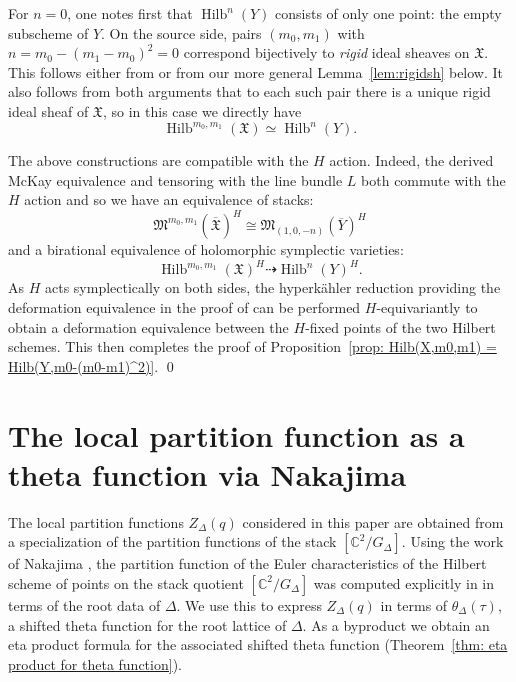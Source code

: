 \documentclass{amsart}
\theoremstyle{definition}
\newcommand{\CC} {{\mathbb C}}          %
\newcommand{\X}{\mathfrak{X}}
\newcommand{\Xbar}{\overline{\mathfrak{X}}}
\newcommand{\Ybar}{\overline{Y}}
\newcommand{\M}{\mathfrak{M}}
\newcommand{\Hilb}{\operatorname{Hilb}}
\newcommand{\adam}{\color{blue}}
\begin{document}
{For $n=0$, one notes first that $\Hilb^{n}(Y)$ consists of only one point: the empty subscheme of $Y$. On the source side, pairs $(m_0,m_1)$ with $n=m_{0} -(m_{1}-m_{0})^{2}=0$ correspond bijectively to \emph{rigid} ideal sheaves on $\X$. This follows either from \cite[Theorem~4.6 and Example~2.25]{fujii2017combinatorial} or from our more general Lemma~\ref{lem:rigidsh} below. It also follows from both arguments that to each such pair there is a unique rigid ideal sheaf of $\X$, so in this case we directly have \[
\Hilb^{m_{0},m_{1}}(\X )\simeq \Hilb^{n}(Y).
\]
}

The above constructions are compatible with the $H$ action. Indeed,
the derived McKay equivalence and tensoring with the line bundle $L$
both commute with the $H$ action and so we have an equivalence of
stacks: 
\[
\M^{m_{0},m_{1}}(\Xbar )^{H} \cong \M_{(1,0,-n)}(\Ybar )^{H}
\]
and a birational equivalence of holomorphic symplectic varieties:
\[
\Hilb^{m_{0},m_{1}}(\X )^{H} \dashrightarrow \Hilb^{n}(Y)^{H}.
\]
{\adam As $H$ acts symplectically on both sides, the hyperkähler reduction providing the deformation equivalence in the proof of
\cite[Cor~4.2]{Nakajima1994Duke} can be performed $H$-equivariantly to obtain a deformation equivalence between the $H$-fixed points of the two Hilbert schemes.
}
This
then completes the proof of Proposition~\ref{prop: Hilb(X,m0,m1) =
Hilb(Y,m0-(m0-m1)^2)}. \qed


\section{The local partition function as a theta function via Nakajima}\label{sec: local partition functions}


The local partition functions $Z_{\Delta}(q)$ considered in this paper
are obtained from a specialization of the partition functions of the
stack $[\CC^{2} /G_{\Delta}]$.  Using the work of Nakajima
\cite{nakajima2002geometric}, the partition function of the Euler
characteristics of the Hilbert scheme of points on the stack quotient
$[\CC^{2}/G_{\Delta}]$ was computed explicitly in
\cite{gyenge2015euler} in terms of the root data of $\Delta$.  We use
this to express $Z_{\Delta}(q)$ in terms of $\theta_{\Delta}(\tau )$,
a shifted theta function for the root lattice of $\Delta$. As a
byproduct we obtain an eta product formula for the associated shifted
theta function (Theorem~\ref{thm: eta product for theta function}).
\end{document}
